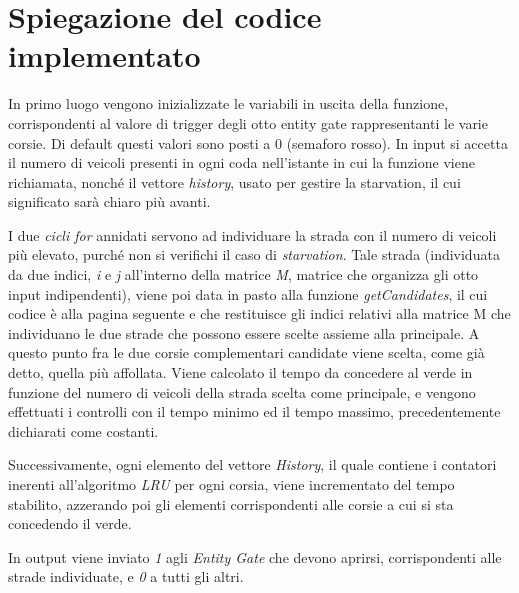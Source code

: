 \section{Spiegazione del codice implementato}
In primo luogo vengono inizializzate le variabili in uscita della funzione, corrispondenti al valore di trigger degli otto entity gate rappresentanti le varie corsie. Di default questi valori sono posti a 0 (semaforo rosso). In input si accetta il numero di veicoli presenti in ogni coda nell'istante in cui la funzione viene richiamata, nonché il vettore \textit{history}, usato per gestire la starvation, il cui significato sarà chiaro più avanti.

I due \textit{cicli for} annidati servono ad individuare la strada con il numero di veicoli più elevato, purché non si verifichi il caso di \textit{starvation}. Tale strada (individuata da due indici, \textit{i} e \textit{j} all’interno della matrice \textit{M}, matrice che organizza gli otto input indipendenti), viene poi data in pasto alla funzione \textit{getCandidates}, il cui codice è alla pagina seguente e che restituisce gli indici relativi alla matrice M che individuano le due strade che possono essere scelte assieme alla principale. A questo punto fra le due corsie complementari candidate viene scelta, come già detto, quella più affollata. Viene calcolato il tempo da concedere al verde in funzione del numero di veicoli della strada scelta come principale, e vengono effettuati i controlli con il tempo minimo ed il tempo massimo, precedentemente dichiarati come costanti.

Successivamente, ogni elemento del vettore \textit{History}, il quale contiene i contatori inerenti all’algoritmo \textit{LRU} per ogni corsia, viene incrementato del tempo stabilito, azzerando poi gli elementi corrispondenti alle corsie a cui si sta concedendo il verde.

In output viene inviato \textit{1} agli \textit{Entity Gate} che devono aprirsi, corrispondenti alle strade individuate, e \textit{0} a tutti gli altri. 

